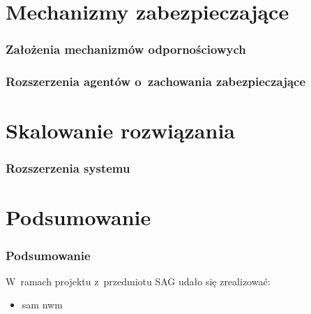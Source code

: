 \documentclass{beamer}
\begin{document}
\section{Mechanizmy zabezpieczające}
\begin{frame}
    \frametitle{Założenia mechanizmów odpornościowych}

\end{frame}

\begin{frame}
    \frametitle{Rozszerzenia agentów o~zachowania zabezpieczające}
    \begin{figure}[!ht]
    \end{figure}
\end{frame}


\section{Skalowanie rozwiązania}
\begin{frame}
    \frametitle{Rozszerzenia systemu}

\end{frame}

\section{Podsumowanie}
\begin{frame}
    \frametitle{Podsumowanie}
    W~ramach projektu z~przedmiotu SAG udało się zrealizować:
    \begin{itemize}
        \item sam nwm
    \end{itemize}
\end{frame}
\end{document}
